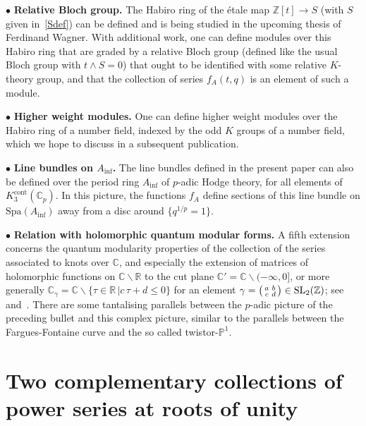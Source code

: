 \documentclass[12pt,reqno]{amsart}
\theoremstyle{definition}
\def\BZ{\mathbb Z}
\def\BR{\mathbb R}
\def\BC{\mathbb C}
\def\SL{\mathrm{SL}}
\def\sma#1#2#3#4{\bigl(\smallmatrix#1&#2\\#3&#4\endsmallmatrix\bigr)} %
\def\Phitof{f}
\begin{document}
\noindent $\bullet$ {\bf Relative Bloch group.}
The Habiro ring of the \'etale map $\BZ[t]\to S$
(with $S$ given in~\eqref{Sdef}) can be defined and
is being studied in the upcoming thesis of Ferdinand Wagner. With additional work,
one can define modules over this Habiro ring that are graded by a relative Bloch group
(defined like the usual Bloch group with $t \wedge S = 0$)
that ought to be identified with some relative $K$-theory group, and that the
collection of series $\Phitof_{A}(t,q)$ is an element of such a module.

\noindent $\bullet$ {\bf Higher weight modules.}
One can define higher weight modules over the Habiro ring of a number field,
indexed by the odd $K$ groups of a number field, which we hope to discuss in a
subsequent publication.

\noindent $\bullet$ {\bf Line bundles on $A_{\mathrm{inf}}$.}
The line bundles defined in the present paper can also be defined over
the period ring $A_{\mathrm{inf}}$ of $p$-adic Hodge theory, for all elements
of $K_3^{\mathrm{cont}}(\mathbb C_p)$. In this picture, the functions $\Phitof_A$
define sections of this line bundle on $\mathrm{Spa}(A_{\mathrm{inf}})$ away
from a disc around $\{q^{1/p}=1\}$.

\noindent $\bullet$ {\bf Relation with holomorphic quantum modular forms.}
A fifth extension concerns the quantum modularity properties
of the collection of the series associated to knots over $\BC$, and especially
the extension of matrices of holomorphic functions on $\BC\smallsetminus\BR$ to the
cut plane $\BC'=\BC\smallsetminus (-\infty,0]$, or more generally
$\BC_\gamma=\BC\smallsetminus \{\tau \in \BR \,| c \,\tau+d \leq 0\}$ for an element
$\gamma=\sma abcd \in \SL_2(\BZ)$; see~\cite[Sec.5]{GZ:kashaev}
and~\cite[Sec.5]{GZ:qseries}. There are some tantalising parallels between the
$p$-adic picture of the preceding bullet and this complex picture, similar to the
parallels between the Fargues-Fontaine curve and the so called twistor-$\mathbb P^1$.


\section{Two complementary collections of power series at roots of unity}
\label{sec.adm}
\end{document}
